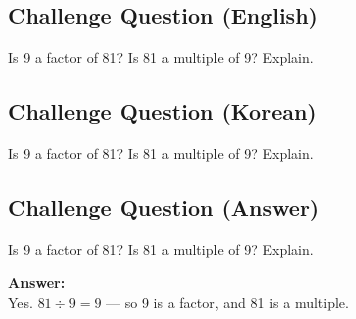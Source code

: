 \cleardoublepage
\subsection*{Challenge Question (English)}
Is 9 a factor of 81? Is 81 a multiple of 9? Explain.


\newpage
\subsection*{Challenge Question (Korean)}
Is 9 a factor of 81? Is 81 a multiple of 9? Explain.


\newpage
\subsection*{Challenge Question (Answer)}
Is 9 a factor of 81? Is 81 a multiple of 9? Explain.

\textbf{Answer:}\\
Yes. $81 \div 9 = 9$ — so 9 is a factor, and 81 is a multiple.
